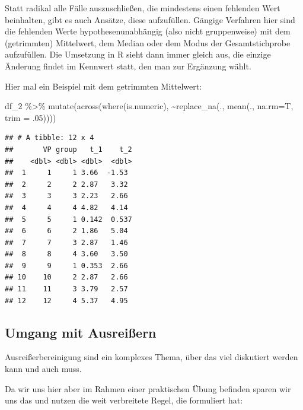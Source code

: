 \documentclass[
]{book}
\newenvironment{Shaded}{\begin{snugshade}}{\end{snugshade}}
\newcommand{\AttributeTok}[1]{\textcolor[rgb]{0.77,0.63,0.00}{#1}}
\newcommand{\DecValTok}[1]{\textcolor[rgb]{0.00,0.00,0.81}{#1}}
\newcommand{\FunctionTok}[1]{\textcolor[rgb]{0.00,0.00,0.00}{#1}}
\newcommand{\NormalTok}[1]{#1}
\newcommand{\SpecialCharTok}[1]{\textcolor[rgb]{0.00,0.00,0.00}{#1}}
\begin{document}
Statt radikal alle Fälle auszuschließen, die mindestens einen fehlenden Wert beinhalten, gibt es auch Ansätze, diese aufzufüllen.
Gängige Verfahren hier sind die fehlenden Werte hypothesenunabhängig (also nicht gruppenweise) mit dem (getrimmten) Mittelwert, dem Median oder dem Modus der Gesamtstichprobe aufzufüllen. Die Umsetzung in R sieht dann immer gleich aus, die einzige Änderung findet im Kennwert statt, den man zur Ergänzung wählt.

Hier mal ein Beispiel mit dem getrimmten Mittelwert:

\begin{Shaded}
\begin{Highlighting}[]
\NormalTok{df\_2 }\SpecialCharTok{\%\textgreater{}\%} 
  \FunctionTok{mutate}\NormalTok{(}\FunctionTok{across}\NormalTok{(}\FunctionTok{where}\NormalTok{(is.numeric), }
                \SpecialCharTok{\textasciitilde{}}\FunctionTok{replace\_na}\NormalTok{(., }
                            \FunctionTok{mean}\NormalTok{(.,}
                                 \AttributeTok{na.rm=}\NormalTok{T,}
                                 \AttributeTok{trim =}\NormalTok{ .}\DecValTok{05}\NormalTok{))))}
\end{Highlighting}
\end{Shaded}

\begin{verbatim}
## # A tibble: 12 x 4
##       VP group   t_1    t_2
##    <dbl> <dbl> <dbl>  <dbl>
##  1     1     1 3.66  -1.53 
##  2     2     2 2.87   3.32 
##  3     3     3 2.23   2.66 
##  4     4     4 4.82   4.14 
##  5     5     1 0.142  0.537
##  6     6     2 1.86   5.04 
##  7     7     3 2.87   1.46 
##  8     8     4 3.60   3.50 
##  9     9     1 0.353  2.66 
## 10    10     2 2.87   2.66 
## 11    11     3 3.79   2.57 
## 12    12     4 5.37   4.95
\end{verbatim}

\hypertarget{umgang-mit-ausreiuxdfern}{%
\subsection{Umgang mit Ausreißern}\label{umgang-mit-ausreiuxdfern}}

Ausreißerbereinigung sind ein komplexes Thema, über das viel diskutiert werden kann und auch muss.

Da wir uns hier aber im Rahmen einer praktischen Übung befinden sparen wir uns das und nutzen die weit verbreitete Regel, die \citet{tukeyExploratoryDataAnalysis1977} formuliert hat:
\end{document}
